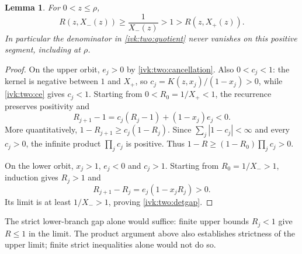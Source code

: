\documentclass[11pt,letterpaper]{article}
\newtheorem{lemma}[theorem]{Lemma}
\theoremstyle{remark}\newtheorem{remark}[theorem]{Remark}
\begin{document}
\begin{lemma}\label{ivk:two:gap}
For $0<z\le\rho$,
\begin{equation}\label{ivk:two:detgap}
 R(z,X_-(z))\ge\frac1{X_-(z)}>1>R(z,X_+(z)).
\end{equation}
In particular the denominator in \eqref{ivk:two:quotient} never vanishes on
this positive segment, including at $\rho$.
\end{lemma}
\begin{proof}
On the upper orbit, $e_j>0$ by \eqref{ivk:two:cancellation}. Also
$0<c_j<1$: the kernel is negative between $1$ and $X_+$, so
$c_j=K(z,x_j)/(1-x_j)>0$, while \eqref{ivk:two:ce} gives $c_j<1$.
Starting from $0<R_0=1/X_+<1$, the recurrence preserves positivity and
\[
 R_{j+1}-1=c_j(R_j-1)+(1-x_j)e_j<0.
\]
More quantitatively, $1-R_{j+1}\ge c_j(1-R_j)$. Since
$\sum_j|1-c_j|<\infty$ and every $c_j>0$, the infinite product
$\prod_jc_j$ is positive. Thus
$1-R\ge(1-R_0)\prod_jc_j>0$.

On the lower orbit, $x_j>1$, $e_j<0$ and $c_j>1$. Starting from
$R_0=1/X_->1$, induction gives $R_j>1$ and
\[
 R_{j+1}-R_j=e_j(1-x_jR_j)>0.
\]
Its limit is at least $1/X_->1$, proving \eqref{ivk:two:detgap}.
\end{proof}
The strict lower-branch gap alone would suffice: finite upper bounds
$R_j<1$ give $R\le1$ in the limit. The product argument above also
establishes strictness of the upper limit; finite strict inequalities
alone would not do so.
\end{document}
